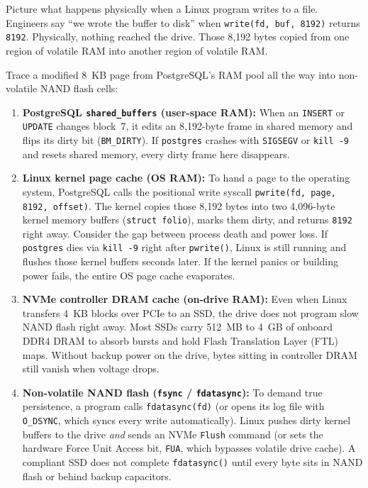 Picture what happens physically when a Linux program writes to a file. Engineers say ``we wrote the buffer to disk'' when \texttt{write(fd, buf, 8192)} returns \texttt{8192}. Physically, nothing reached the drive. Those 8,192 bytes copied from one region of volatile RAM into another region of volatile RAM.

Trace a modified 8~KB page from PostgreSQL's RAM pool all the way into non-volatile NAND flash cells:

\begin{enumerate}
  \item \textbf{PostgreSQL \texttt{shared\_buffers} (user-space RAM):} When an \texttt{INSERT} or \texttt{UPDATE} changes block~7, it edits an 8,192-byte frame in shared memory and flips its dirty bit (\texttt{BM\_DIRTY}). If \texttt{postgres} crashes with \texttt{SIGSEGV} or \texttt{kill -9} and resets shared memory, every dirty frame here disappears.
  \item \textbf{Linux kernel page cache (OS RAM):} To hand a page to the operating system, PostgreSQL calls the positional write syscall \texttt{pwrite(fd, page, 8192, offset)}. The kernel copies those 8,192 bytes into two 4,096-byte kernel memory buffers (\texttt{struct folio}), marks them dirty, and returns \texttt{8192} right away. Consider the gap between process death and power loss. If \texttt{postgres} dies via \texttt{kill -9} right after \texttt{pwrite()}, Linux is still running and flushes those kernel buffers seconds later. If the kernel panics or building power fails, the entire OS page cache evaporates.
  \item \textbf{NVMe controller DRAM cache (on-drive RAM):} Even when Linux transfers 4~KB blocks over PCIe to an SSD, the drive does not program slow NAND flash right away. Most SSDs carry 512~MB to 4~GB of onboard DDR4 DRAM to absorb bursts and hold Flash Translation Layer (FTL) maps. Without backup power on the drive, bytes sitting in controller DRAM still vanish when voltage drops.
  \item \textbf{Non-volatile NAND flash (\texttt{fsync} / \texttt{fdatasync}):} To demand true persistence, a program calls \texttt{fdatasync(fd)} (or opens its log file with \texttt{O\_DSYNC}, which syncs every write automatically). Linux pushes dirty kernel buffers to the drive \emph{and} sends an NVMe \texttt{Flush} command (or sets the hardware Force Unit Access bit, \texttt{FUA}, which bypasses volatile drive cache). A compliant SSD does not complete \texttt{fdatasync()} until every byte sits in NAND flash or behind backup capacitors.
\end{enumerate}

